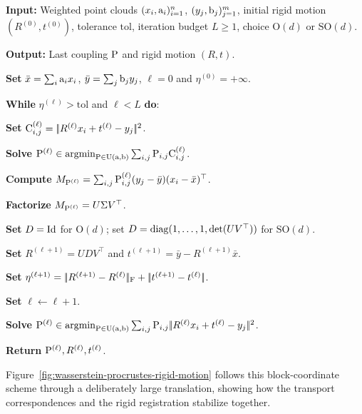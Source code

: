 \begin{alg}\label{alg:wasserstein-procrustes}
\textbf{Input:} Weighted point clouds $(x_i,\a_i)_{i=1}^n$, $(y_j,\b_j)_{j=1}^m$, initial rigid motion $(R^{(0)},t^{(0)})$, tolerance $\mathrm{tol}$, iteration budget $L\geq1$, choice $\mathrm O(d)$ or $\mathrm{SO}(d)$.

\textbf{Output:} Last coupling $\P$ and rigid motion $(R,t)$.

\textbf{Set} $\bar x=\sum_i\a_i x_i$, $\bar y=\sum_j\b_j y_j$, $\ell=0$ and $\eta^{(0)}=+\infty$.

\textbf{While} $\eta^{(\ell)}>\mathrm{tol}$ and $\ell<L$ \textbf{do}:
\begin{algblock}

\textbf{Set} \(\C_{i,j}^{(\ell)}=\norm{R^{(\ell)}x_i+t^{(\ell)}-y_j}^2\).

\textbf{Solve} \(\P^{(\ell)}\in\argmin_{\P\in\CouplingsD(\a,\b)}\sum_{i,j}\P_{i,j}\C_{i,j}^{(\ell)}\).

\textbf{Compute} \(M_{\P^{(\ell)}}=\sum_{i,j}\P^{(\ell)}_{i,j}(y_j-\bar y)(x_i-\bar x)^\top\).

\textbf{Factorize} \(M_{\P^{(\ell)}}=U\Sigma V^\top\).

\textbf{Set} \(D=\Id\) for $\mathrm O(d)$; set \(D=\diag(1,\ldots,1,\det(UV^\top))\) for $\mathrm{SO}(d)$.

\textbf{Set} \(R^{(\ell+1)}=UDV^\top\) and \(t^{(\ell+1)}=\bar y-R^{(\ell+1)}\bar x\).

\textbf{Set} \(\eta^{(\ell+1)}=\norm{R^{(\ell+1)}-R^{(\ell)}}_{\mathrm F}+\norm{t^{(\ell+1)}-t^{(\ell)}}\).

\textbf{Set} \(\ell\leftarrow \ell+1\).
\end{algblock}
\algreturnskip
\textbf{Solve} \(\P^{(\ell)}\in\argmin_{\P\in\CouplingsD(\a,\b)}\sum_{i,j}\P_{i,j}\norm{R^{(\ell)}x_i+t^{(\ell)}-y_j}^2\).

\textbf{Return} \(\P^{(\ell)},R^{(\ell)},t^{(\ell)}\).
\end{alg}

Figure~\ref{fig:wasserstein-procrustes-rigid-motion} follows this block-coordinate scheme through a deliberately large translation, showing how the transport correspondences and the rigid registration stabilize together.

